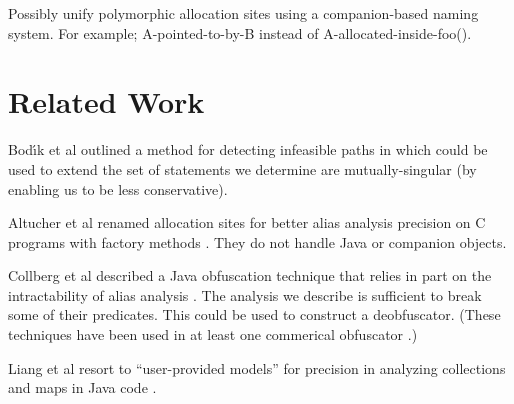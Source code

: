 \documentclass[11pt,notitlepage]{article}
\begin{document}
Possibly unify polymorphic allocation sites using a companion-based
naming system.  For example; A-pointed-to-by-B instead of
A-allocated-inside-foo().

\section{Related Work}

Bod{\'\i}k et al outlined a method for detecting infeasible paths
in \cite{267921} which could be used to extend the set of statements
we determine are mutually-singular (by enabling us to be less conservative).

Altucher et al renamed allocation sites for better alias analysis
precision on C programs with factory methods \cite{199466}.  They
do not handle Java or companion objects.

Collberg et al described a Java obfuscation technique that relies in
part on the intractability of alias analysis \cite{268962}.  The
analysis we describe is sufficient to break some of their predicates.
This could be used to construct a deobfuscator.  (These techniques
have been used in at least one commerical obfuscator \cite{humper02}.)

Liang et al resort to ``user-provided models'' for precision in
analyzing collections and maps in Java code \cite{379676}.


\end{document}
